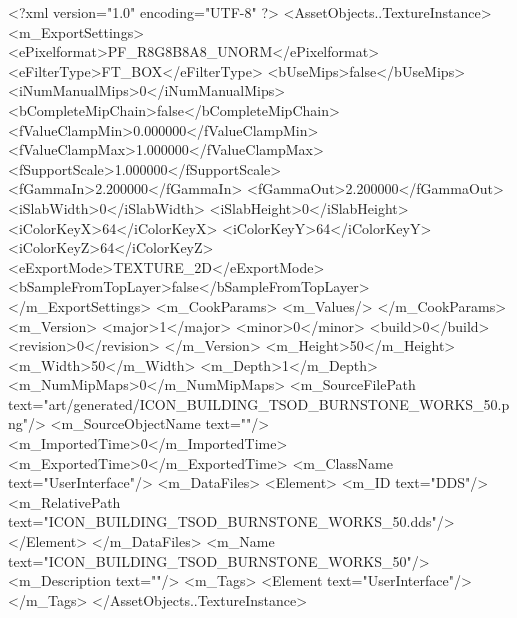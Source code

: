 <?xml version="1.0" encoding="UTF-8" ?>
<AssetObjects..TextureInstance>
	<m_ExportSettings>
		<ePixelformat>PF_R8G8B8A8_UNORM</ePixelformat>
		<eFilterType>FT_BOX</eFilterType>
		<bUseMips>false</bUseMips>
		<iNumManualMips>0</iNumManualMips>
		<bCompleteMipChain>false</bCompleteMipChain>
		<fValueClampMin>0.000000</fValueClampMin>
		<fValueClampMax>1.000000</fValueClampMax>
		<fSupportScale>1.000000</fSupportScale>
		<fGammaIn>2.200000</fGammaIn>
		<fGammaOut>2.200000</fGammaOut>
		<iSlabWidth>0</iSlabWidth>
		<iSlabHeight>0</iSlabHeight>
		<iColorKeyX>64</iColorKeyX>
		<iColorKeyY>64</iColorKeyY>
		<iColorKeyZ>64</iColorKeyZ>
		<eExportMode>TEXTURE_2D</eExportMode>
		<bSampleFromTopLayer>false</bSampleFromTopLayer>
	</m_ExportSettings>
	<m_CookParams>
		<m_Values/>
	</m_CookParams>
	<m_Version>
		<major>1</major>
		<minor>0</minor>
		<build>0</build>
		<revision>0</revision>
	</m_Version>
	<m_Height>50</m_Height>
	<m_Width>50</m_Width>
	<m_Depth>1</m_Depth>
	<m_NumMipMaps>0</m_NumMipMaps>
	<m_SourceFilePath text="art/generated/ICON_BUILDING_TSOD_BURNSTONE_WORKS_50.png"/>
	<m_SourceObjectName text=""/>
	<m_ImportedTime>0</m_ImportedTime>
	<m_ExportedTime>0</m_ExportedTime>
	<m_ClassName text="UserInterface"/>
	<m_DataFiles>
		<Element>
			<m_ID text="DDS"/>
			<m_RelativePath text="ICON_BUILDING_TSOD_BURNSTONE_WORKS_50.dds"/>
		</Element>
	</m_DataFiles>
	<m_Name text="ICON_BUILDING_TSOD_BURNSTONE_WORKS_50"/>
	<m_Description text=""/>
	<m_Tags>
		<Element text="UserInterface"/>
	</m_Tags>
</AssetObjects..TextureInstance>
